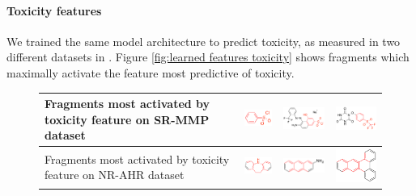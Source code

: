 \documentclass{article}
\newcommand{\citet}{\cite}
\begin{document}
\paragraph{Toxicity features}
We trained the same model architecture to predict toxicity, as measured in two different datasets in \citet{tox21}.
Figure \ref{fig:learned features toxicity} shows fragments which maximally activate the feature most predictive of toxicity.
\newcommand{\molfeaturetox}[2]{\texttt{[image: ../../DeepMoleculesData/experiments/2015-05-30-visualize-fps/5-toxic-diff-dataset/figures/fp\_\#1\_highlight\_\#2.pdf]}}%
\begin{figure}[h]
\begin{tabular}{>{\centering}m{1in} >{\centering}m{3.1cm} >{\centering}m{3.3cm} >{\centering\arraybackslash}m{3.1cm}}
Fragments most activated by toxicity feature on SR-MMP dataset
& \includegraphics[width=2.2cm]{figures/jorge-figures/7.png} 
& \includegraphics[width=3.3cm]{figures/jorge-figures/8.png}
& \includegraphics[width=3.3cm]{figures/jorge-figures/9.png}\\
\midrule
Fragments most activated by toxicity feature on NR-AHR dataset
& \includegraphics[width=2.2cm]{figures/jorge-figures/10.png} 
& \includegraphics[width=3.3cm]{figures/jorge-figures/11.png}
& \includegraphics[width=2.9cm]{figures/jorge-figures/12.png}\\

\end{tabular}
\end{figure}
\end{document}
